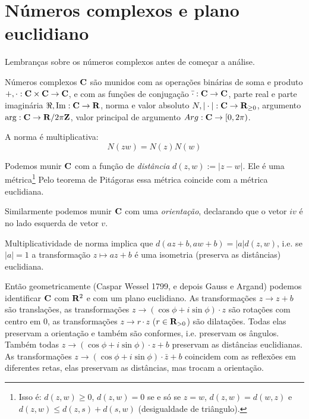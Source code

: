 
\section*{Números complexos e plano euclidiano}

Lembranças sobre os números complexos antes de começar a análise.

Números complexos $\mathbf{C}$ são munidos com as operações binárias
de soma e produto $+,\cdot : \mathbf{C} \times \mathbf{C} \to \mathbf{C}$,
e com as funções de 
conjugação $\bar{\cdot} : \mathbf{C} \to \mathbf{C}$,
parte real e parte imaginária $\Re,\operatorname{Im} : \mathbf{C} \to \mathbf{R}$,
norma e valor absoluto $N,|\cdot| : \mathbf{C} \to \mathbf{R}_{\geq 0}$,
argumento $\arg : \mathbf{C} \to \mathbf{R}/2\pi\mathbf{Z}$,
valor principal de argumento $Arg : \mathbf{C} \to [0,2\pi)$.

A norma é multiplicativa:
$$ N(zw) = N(z) N(w) $$

Podemos munir $\mathbf{C}$ com a função de \emph{distância} $d(z,w) := |z-w|$.
Ele é uma métrica\footnote{Isso é: $d(z,w) \geq 0$, $d(z,w) = 0$ se e só se $z=w$,
$d(z,w) = d(w,z)$ e $d(z,w) \leq d(z,s) + d(s,w)$ (desigualdade de triângulo).}
Pelo teorema de Pitágoras essa métrica coincide com a métrica euclidiana.

Similarmente podemos munir $\mathbf{C}$ com uma \emph{orientação}, declarando que o vetor $i v$ é no lado esquerda de vetor $v$.

Multiplicatividade de norma implica que $d(az+b,aw+b) = |a| d(z,w)$, i.e. se $|a|=1$ a transformação $z\mapsto az+b$
é uma isometria (preserva as distâncias) euclidiana.

Então geometricamente (Caspar Wessel 1799, e depois Gauss e Argand) 
podemos identificar $\mathbf{C}$ com $\mathbf{R}^2$ e com um plano euclidiano.
As transformações $z \to z + b$ são translações,
as transformações $z \to (\cos \phi + i \sin \phi) \cdot z$ são rotações com centro em $0$,
as transformações $z \to r \cdot z$ ($r\in\mathbf{R}_{>0}$) são dilatações. 
Todas elas preservam a orientação e também são conformes, i.e. preservam os ângulos.
Também todas $z \to (\cos \phi + i \sin \phi) \cdot z + b$ preservam as distâncias euclidianas.
As transformações $z \to (\cos \phi + i \sin \phi) \cdot \bar{z} + b$ coincidem com as reflexões
em diferentes retas, elas preservam as distâncias, mas trocam a orientação.

